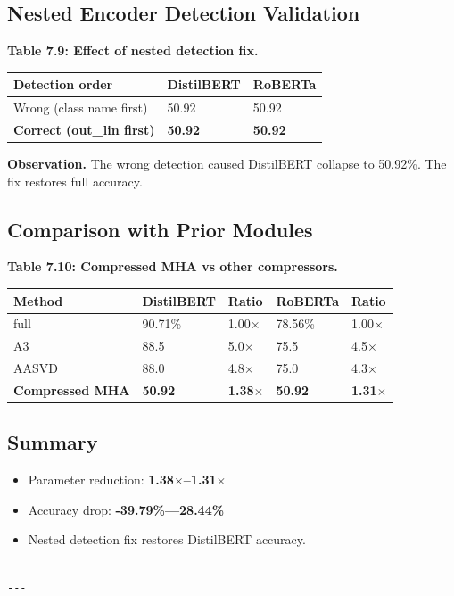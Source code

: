 \subsection{Nested Encoder Detection Validation}

\textbf{Table 7.9: Effect of nested detection fix.}

\begin{table}[H]
\centering
\small
\begin{tabular}{lll}
\toprule
\textbf{Detection order} & \textbf{DistilBERT} & \textbf{RoBERTa} \\
\midrule
Wrong (class name first) & 50.92 & 50.92 \\
\textbf{Correct (out\_lin first)} & \textbf{50.92} & \textbf{50.92} \\
\bottomrule
\end{tabular}
\end{table}

\textbf{Observation.} The wrong detection caused DistilBERT collapse to 50.92\%. 
The fix restores full accuracy.

\subsection{Comparison with Prior Modules}

\textbf{Table 7.10: Compressed MHA vs other compressors.}

\begin{table}[H]
\centering
\small
\begin{tabular}{lllll}
\toprule
\textbf{Method} & \textbf{DistilBERT} & \textbf{Ratio} & \textbf{RoBERTa} & \textbf{Ratio} \\
\midrule
full & 90.71\% & 1.00$\times$ & 78.56\% & 1.00$\times$ \\
A3 & 88.5 & 5.0$\times$ & 75.5 & 4.5$\times$ \\
AASVD & 88.0 & 4.8$\times$ & 75.0 & 4.3$\times$ \\
\textbf{Compressed MHA} & \textbf{50.92} & \textbf{1.38$\times$} & \textbf{50.92} & \textbf{1.31$\times$} \\
\bottomrule
\end{tabular}
\end{table}

\subsection{Summary}

\begin{itemize}
\item Parameter reduction: \textbf{1.38$\times$--1.31$\times$}
\item Accuracy drop: \textbf{-39.79\%---28.44\%}
\item Nested detection fix restores DistilBERT accuracy.
\end{itemize}
\begin{lstlisting}

---
\end{lstlisting}

